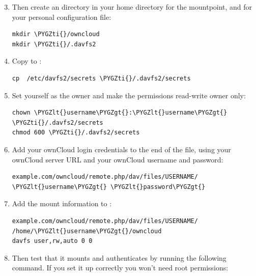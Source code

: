\documentclass[letterpaper,10pt,english]{sphinxmanual}
\def\PYGZlt{\char`\<}
\def\PYGZgt{\char`\>}
\def\PYGZti{\char`\~}
\begin{document}
\begin{enumerate}
\setcounter{enumi}{2}
\item {} 
Then create an  directory in your home directory for the
mountpoint, and  for your personal configuration file:

\begin{Verbatim}[commandchars=\\\{\}]
mkdir \PYGZti{}/owncloud
mkdir \PYGZti{}/.davfs2
\end{Verbatim}

\item {} 
Copy  to :

\begin{Verbatim}[commandchars=\\\{\}]
cp  /etc/davfs2/secrets \PYGZti{}/.davfs2/secrets
\end{Verbatim}

\item {} 
Set yourself as the owner and make the permissions read-write owner only:

\begin{Verbatim}[commandchars=\\\{\}]
chown \PYGZlt{}username\PYGZgt{}:\PYGZlt{}username\PYGZgt{}  \PYGZti{}/.davfs2/secrets
chmod 600 \PYGZti{}/.davfs2/secrets
\end{Verbatim}

\item {} 
Add your ownCloud login credentials to the end of the  file,
using your ownCloud server URL and your ownCloud username and password:

\begin{Verbatim}[commandchars=\\\{\}]
example.com/owncloud/remote.php/dav/files/USERNAME/ \PYGZlt{}username\PYGZgt{} \PYGZlt{}password\PYGZgt{}
\end{Verbatim}

\item {} 
Add the mount information to :

\begin{Verbatim}[commandchars=\\\{\}]
example.com/owncloud/remote.php/dav/files/USERNAME/ /home/\PYGZlt{}username\PYGZgt{}/owncloud
davfs user,rw,auto 0 0
\end{Verbatim}

\item {} 
Then test that it mounts and authenticates by running the following
command. If you set it up correctly you won't need root permissions:


\end{enumerate}
\end{document}
